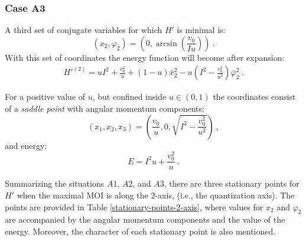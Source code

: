 \subsubsection*{Case A3}

A third set of conjugate variables for which $H'$ is minimal is: $$(x_2,\varphi_2)=(0,\arcsin\left(\frac{v_0}{Iu}\right))\ .$$ With this set of coordinates the energy function will become after expansion:
\begin{align}
    H'^{(2)}=uI^2+\frac{v_0^2}{u}+(1-u)\bar{x}_2^2-u\left(I^2-\frac{v_0^2}{u^2}\right)\bar{\varphi}_2^2\ .
\end{align}

For a positive value of $u$, but confined inside $u\in(0,1)$ the coordinates consist of a \emph{saddle point} with angular momentum components: $$(x_1,x_2,x_3)=\left(\frac{v_0}{u},0,\sqrt{I^2-\frac{v_0^2}{u^2}}\right)\ ,$$ and energy: $$E=I^2u+\frac{v_0^2}{u}\ .$$

Summarizing the situations $A1$, $A2$, and $A3$, there are three stationary points for $H'$ when the maximal MOI is along the $2$-axis, (i.e., the quantization axis). The points are provided in Table \ref{stationary-points-2-axis}, where values for $x_2$ and $\varphi_2$ are accompanied by the angular momentum components and the value of the energy. Moreover, the character of each stationary point is also mentioned.
\begin{table}
    \centering
    \caption{The stationary points for the classical energy function depicted in Eq. \ref{new-boson-h-prime-classical}, when the quantization axis is the $2$-axis. Each point corresponds to the cases $A1$, $A2$, and $A3$, respectively.}
    \label{stationary-points-2-axis}
\end{table}

